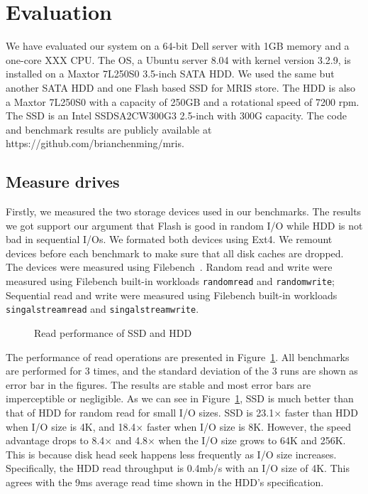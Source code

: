 \section{Evaluation} \label{sec:eval}

We have evaluated our system on a 64-bit Dell server with 1GB memory
and a one-core XXX CPU. The OS, a Ubuntu server 8.04 with kernel
version 3.2.9, is installed on a Maxtor 7L250S0 3.5-inch SATA HDD. We
used the same but another SATA HDD and one Flash based SSD for MRIS
store. The HDD is also a Maxtor 7L250S0 with a capacity of 250GB and a
rotational speed of 7200 rpm.  The SSD is an Intel SSDSA2CW300G3
2.5-inch with 300G capacity.  The code and benchmark results are
publicly available at https://github.com/brianchenming/mris.

\subsection{Measure drives}

Firstly, we measured the two storage devices used in our benchmarks.
The results we got support our argument that Flash is good in random
I/O while HDD is not bad in sequential I/Os. We formated both devices
using Ext4. We remount devices before each benchmark to make sure that
all disk caches are dropped. The devices were measured using
Filebench~\cite{filebench-web}. Random read and write were measured
using Filebench built-in workloads \texttt{randomread} and
\texttt{randomwrite}; Sequential read and write were measured using
Filebench built-in workloads \texttt{singalstreamread} and
\texttt{singalstreamwrite}.

\begin{figure}[t]
\begin{centering}
\caption{Read performance of SSD and HDD}
\label{fig:driveread}
\end{centering}
\end{figure}

The performance of read operations are presented in
Figure~\ref{fig:driveread}. All benchmarks are performed for 3 times,
and the standard deviation of the 3 runs are shown as error bar in the
figures. The results are stable and most error bars are imperceptible
or negligible. As we can see in Figure~\ref{fig:driveread}, SSD is
much better than that of HDD for random read for small I/O sizes. SSD
is 23.1$\times$ faster than HDD when I/O size is 4K, and 18.4$\times$
faster when I/O size is 8K. However, the speed advantage drops to
8.4$\times$ and 4.8$\times$ when the I/O size grows to 64K and 256K.
This is because disk head seek happens less frequently as I/O size
increases. Specifically, the HDD read throughput is 0.4mb/s with an
I/O size of 4K. This agrees with the 9ms average read time shown in
the HDD's specification.  

